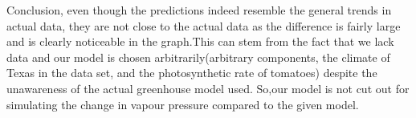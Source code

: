 \documentclass[a4paper]{article}
\numberwithin{equation}{section}
\begin{document}
Conclusion, even though the predictions indeed resemble the general trends in actual data, they are not close to the actual data as the difference is fairly large and is clearly noticeable in the graph.This can stem from the fact that we lack data and our model is chosen arbitrarily(arbitrary components, the climate of Texas in the data set, and the photosynthetic rate of tomatoes) despite the unawareness of the actual greenhouse model used. So,our model is not cut out for simulating the change in vapour pressure compared to the given model.

\newpage
\printbibliography[heading=bibintoc]
\end{document}
